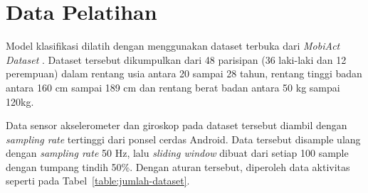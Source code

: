 


%
%
\section{Data Pelatihan}
Model klasifikasi dilatih dengan menggunakan dataset terbuka dari \textit{MobiAct Dataset} \Parencite{vavoulas-2016}. Dataset tersebut dikumpulkan dari 48 parisipan (36 laki-laki dan 12 perempuan) dalam rentang usia antara 20 sampai 28 tahun, rentang tinggi badan antara 160 cm sampai 189 cm dan rentang berat badan antara 50 kg sampai 120kg.

Data sensor akselerometer dan giroskop pada dataset tersebut diambil dengan \textit{sampling rate} tertinggi dari ponsel cerdas Android. Data tersebut disample ulang dengan \textit{sampling rate} 50 Hz, lalu \textit{sliding window} dibuat dari setiap 100 sample dengan tumpang tindih 50\%. Dengan aturan tersebut, diperoleh data aktivitas seperti pada Tabel~\ref{table:jumlah-dataset}.

